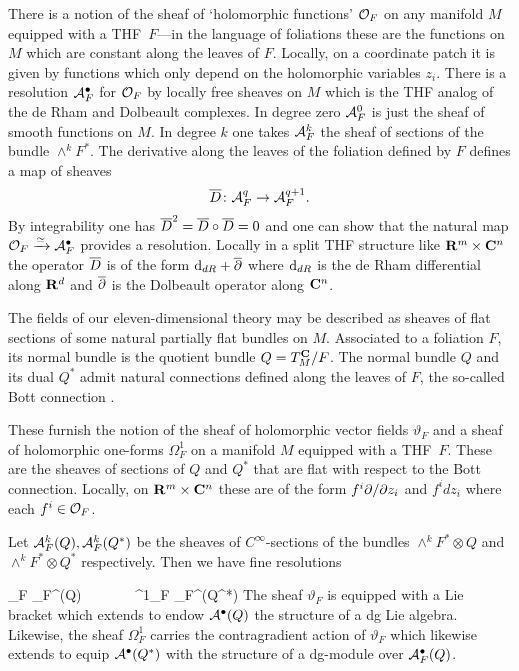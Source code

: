 There is a notion of the sheaf of `holomorphic functions' $\mathcal O_F$ on any manifold $M$ equipped with a THF~$F$---in the language of foliations these are the functions on $M$ which are constant along the leaves of $F$.
Locally, on a coordinate patch it is given by functions which only depend on the holomorphic variables $z_i$.
There is a resolution $\mathcal A^\bullet_F$ for $\mathcal O_F$ by locally free sheaves on $M$ which is the THF analog of the de Rham and Dolbeault complexes. 
In degree zero $\mathcal A^0_F$ is just the sheaf of smooth functions on $M$.
In degree $k$ one takes $\mathcal A^k_F$ the sheaf of sections of the bundle $\wedge^k F^*$.
The derivative along the leaves of the foliation defined by $F$ defines a map of sheaves
\[
\overline{D} \colon \mathcal A^{q}_F \to \mathcal A^{q+1}_F  .
\]
By integrability one has $\overline{D}^2 = \overline{D} \circ \overline{D} = 0$ and one can show that the natural map $\mathcal O_F \xrightarrow{\simeq} \mathcal A^\bullet_F$ provides a resolution.
Locally in a split THF structure like $\mathbf{R}^m \times \mathbf{C}^n$ the operator $\overline{D}$ is of the form ${\rm d}_{dR} + \overline{\partial}$ where ${\rm d}_{dR}$ is the de Rham differential along $\mathbf{R}^d$ and $\overline{\partial}$ is the Dolbeault operator along $\mathbf{C}^n$.


The fields of our eleven-dimensional theory may be described as sheaves of flat sections of some natural partially flat bundles on $M$. Associated to a foliation $F$, its normal bundle is the quotient bundle $Q = T^{\mathbf{C}}_{M}/F$. The normal bundle $Q$ and its dual $Q^{*}$ admit natural connections defined along the leaves of $F$, the so-called Bott connection \cite{KamberTondeur}.

These furnish the notion of the sheaf of holomorphic vector fields $\vartheta_F$ and a sheaf of holomorphic one-forms $\Omega^1_F$ on a manifold $M$ equipped with a THF~$F$. These are the sheaves of sections of $Q$ and $Q^{*}$ that are flat with respect to the Bott connection. Locally, on $\mathbf{R}^m \times \mathbf{C}^n$ these are of the form $f^i \partial / \partial z_i$ and $f^{i}dz_{i}$ where each $f^i \in \mathcal O_F$.

Let $\mathcal A^k_{F}(Q), \mathcal A^{k}_{F}(Q^{*})$ be the sheaves of $C^\infty$-sections of the bundles $\wedge^k F^{*} \otimes Q$ and $\wedge^{k}F^{*}\otimes Q^{*}$ respectively. Then we have fine resolutions

\beqn
\vartheta_F \xto{\simeq} \cA_F^\bu(Q) \ \ \ \ \ \ \ \Omega^1_F \xto{\simeq}  \cA_F^\bu(Q^*)
\eeqn
The sheaf $\vartheta_F$ is equipped with a Lie bracket which extends to endow $\mathcal A^\bullet(Q)$ the structure of a dg Lie algebra. Likewise, the sheaf $\Omega^{1}_{F}$ carries the contragradient action of $\vartheta_{F}$ which likewise extends to equip $\mathcal A^{\bullet}(Q^{*})$ with the structure of a dg-module over $\mathcal A_{F}^{\bullet}(Q)$.

